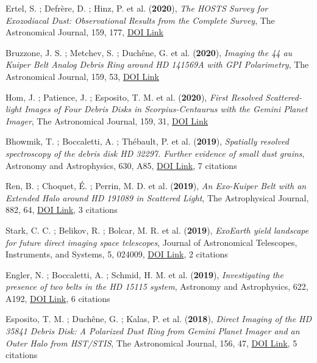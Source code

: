 \documentclass[11pt]{article}
\begin{document}
\begin{etaremune} \itemsep 0pt

\item Ertel, S. ; Defr{\`e}re, D. ; Hinz, P. et al. ({\bf2020}), {\it The HOSTS Survey for Exozodiacal Dust: Observational Results from the Complete Survey}, The Astronomical Journal, 159, 177, \href{https://doi.org/10.3847/1538-3881/ab7817}{DOI Link}

 \item Bruzzone, J. S. ; Metchev, S. ; Duch{\^e}ne, G. et al. ({\bf2020}), {\it Imaging the 44 au Kuiper Belt Analog Debris Ring around HD 141569A with GPI Polarimetry}, The Astronomical Journal, 159, 53, \href{https://doi.org/10.3847/1538-3881/ab5d2e}{DOI Link}

 \item Hom, J. ; Patience, J. ; Esposito, T. M. et al. ({\bf2020}), {\it First Resolved Scattered-light Images of Four Debris Disks in Scorpius-Centaurus with the Gemini Planet Imager}, The Astronomical Journal, 159, 31, \href{https://doi.org/10.3847/1538-3881/ab5af2}{DOI Link}

 \item Bhowmik, T. ; Boccaletti, A. ; Th{\'e}bault, P. et al. ({\bf2019}), {\it Spatially resolved spectroscopy of the debris disk HD 32297. Further evidence of small dust grains}, Astronomy and Astrophysics, 630, A85, \href{https://doi.org/10.1051/0004-6361/201936076}{DOI Link}, 7 citations

 \item Ren, B. ; Choquet, {\'E}. ; Perrin, M. D. et al. ({\bf2019}), {\it An Exo-Kuiper Belt with an Extended Halo around HD 191089 in Scattered Light}, The Astrophysical Journal, 882, 64, \href{https://doi.org/10.3847/1538-4357/ab3403}{DOI Link}, 3 citations

 \item Stark, C. C. ; Belikov, R. ; Bolcar, M. R. et al. ({\bf2019}), {\it ExoEarth yield landscape for future direct imaging space telescopes}, Journal of Astronomical Telescopes, Instruments, and Systems, 5, 024009, \href{https://doi.org/10.1117/1.JATIS.5.2.024009}{DOI Link}, 2 citations

 \item Engler, N. ; Boccaletti, A. ; Schmid, H. M. et al. ({\bf2019}), {\it Investigating the presence of two belts in the HD 15115 system}, Astronomy and Astrophysics, 622, A192, \href{https://doi.org/10.1051/0004-6361/201833542}{DOI Link}, 6 citations

 \item Esposito, T. M. ; Duch{\^e}ne, G. ; Kalas, P. et al. ({\bf2018}), {\it Direct Imaging of the HD 35841 Debris Disk: A Polarized Dust Ring from Gemini Planet Imager and an Outer Halo from HST/STIS}, The Astronomical Journal, 156, 47, \href{https://doi.org/10.3847/1538-3881/aacbc9}{DOI Link}, 5 citations


\end{etaremune}
\end{document}
